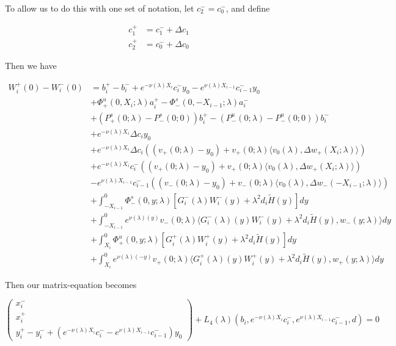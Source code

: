 \documentclass[12pt]{article}
\begin{document}
\begin{enumerate}
To allow us to do this with one set of notation, let $c_2^- = c_0^-$, and define 

\begin{align*}
c_1^+ &= c_1^- + \Delta c_1 \\
c_2^+ &= c_0^- + \Delta c_0
\end{align*}

Then we have

\begin{align*}
W_i^+(0) - W_i^-(0) &= b_i^+ - b_i^- + e^{-\nu(\lambda)X_i} c_i^- y_0 - e^{\nu(\lambda)X_{i-1}} c_{i-1}^- y_0\\
&+ \Phi^u_+(0, X_i; \lambda)a_i^+ - \Phi^s_-(0, -X_{i-1}; \lambda)a_i^- \\
&+ (P^s_+(0; \lambda) - P^s_-(0; 0))b_i^+  - (P^u_-(0; \lambda) - P^u_-(0; 0))b_i^- \\
&+ e^{-\nu(\lambda)X_i} \Delta c_i y_0 \\
&+ e^{-\nu(\lambda)X_i} \Delta c_i ( (v_+(0; \lambda) - y_0) + v_+(0; \lambda) \langle  v_0(\lambda), \Delta w_+(X_i; \lambda) \rangle) \\
&+ e^{-\nu(\lambda)X_i} c_i^-( (v_+(0; \lambda) - y_0) + v_+(0; \lambda) \langle  v_0(\lambda), \Delta w_+(X_i; \lambda) \rangle) \\
&- e^{\nu(\lambda)X_{i-1}} c_{i-1}^- ( (v_-(0; \lambda) - y_0) + v_-(0; \lambda) \langle  v_0(\lambda), \Delta w_-(-X_{i-1}; \lambda) \rangle) \\
&+ \int_{-X_{i-1}}^0 \Phi^s_-(0, y; \lambda) [ G_i^-(\lambda)W_i^-(y) + \lambda^2 d_i \tilde{H}(y) ] dy \\
&+ \int_{-X_{i-1}}^0
e^{\nu(\lambda)(y)} v_-(0; \lambda) \langle G_i^-(\lambda)(y)W_i^-(y) + \lambda^2 d_i \tilde{H}(y), w_-(y; \lambda) \rangle dy \\
&+ \int_{X_i}^0 \Phi^u_+(0, y; \lambda) [ G_i^+(\lambda)W_i^+(y) + \lambda^2 d_i \tilde{H}(y) ] dy \\
&+ \int_{X_i}^0 e^{\nu(\lambda)(-y)} v_+(0; \lambda) \langle G_i^+(\lambda)(y)W_i^+(y) + \lambda^2 d_i \tilde{H}(y), w_+(y; \lambda) \rangle dy
\end{align*}

Then our matrix-equation becomes

\[
\begin{pmatrix}x_i^- \\ x_i^+ \\ y_i^+ - y_i^- + (e^{-\nu(\lambda)X_i} c_i^- - e^{\nu(\lambda)X_{i-1}} c_{i-1}^-) y_0 \end{pmatrix} + L_4(\lambda)(b_i, e^{-\nu(\lambda)X_i} c_i^-, e^{\nu(\lambda)X_{i-1}} c_{i-1}^-, d) = 0
\]


\end{enumerate}
\end{document}
